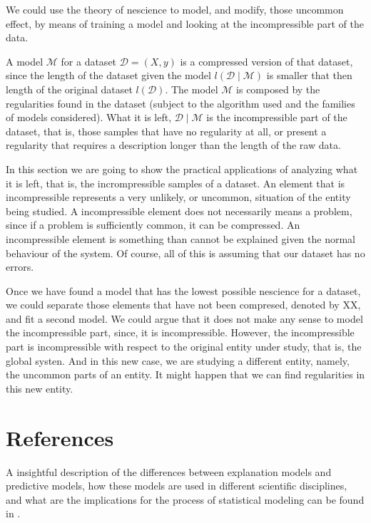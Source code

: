 We could use the theory of nescience to model, and modify, those uncommon effect, by means of training a model and looking at the incompressible part of the data.


A model $\mathcal{M}$ for a dataset $\mathcal{D} = (X, y)$ is a compressed version of that dataset, since the length of the dataset given the model $l(\mathcal{D} \mid \mathcal{M})$ is smaller that then length of the original dataset $l(\mathcal{D})$. The model $\mathcal{M}$ is composed by the regularities found in the dataset (subject to the algorithm used and the families of models considered). What it is left, $\mathcal{D} \mid \mathcal{M}$ is the incompressible part of the dataset, that is, those samples that have no regularity at all, or present a regularity that requires a description longer than the length of the raw data.

In this section we are going to show the practical applications of analyzing what it is left, that is, the incrompressible samples of a dataset. An element that is incompressible represents a very unlikely, or uncommon, situation of the entity being studied. A incompressible element does not necessarily means a problem, since if a problem is sufficiently common, it can be compressed. An incompressible element is something than cannot be explained given the normal behaviour of the system. Of course, all of this is assuming that our dataset has no errors.

Once we have found a model that has the lowest possible nescience for a dataset, we could separate those elements that have not been compresed, denoted by XX, and fit a second model. We could argue that it does not make any sense to model the incompressible part, since, it is incompressible. However, the incompressible part is incompressible with respect to the original entity under study, that is, the global systen. And in this new case, we are studying a different entity, namely, the uncommon parts of an entity. It might happen that we can find regularities in this new entity.



%
%

\section*{References}
\label{sec:ML_references}

A insightful description of the differences between explanation models and predictive models, how these models are used in different scientific disciplines, and what are the implications for the process of statistical modeling can be found in \cite{shmueli2010explain}.

